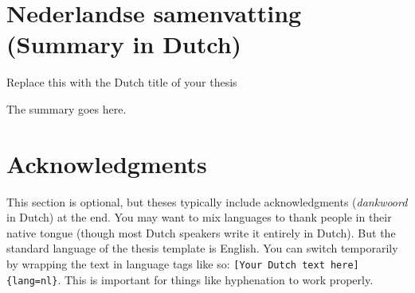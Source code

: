 \documentclass[12pt,american,a4paper,oneside,]{memoir} %
\newcommand{\textdutch}[2][]{\foreignlanguage{dutch}{#2}}
\newenvironment{dutch}[2][]{\begin{otherlanguage}{dutch}}{\end{otherlanguage}}
\begin{document}
\normalsize
\setlength{\parindent}{1.5em}

\hypertarget{nederlandse-samenvatting-summary-in-dutch}{%
\chapter*{Nederlandse samenvatting (Summary in Dutch)}\label{nederlandse-samenvatting-summary-in-dutch}}


\begin{dutch}

\emph{Replace this with the Dutch title of your thesis}

\bigskip

The summary goes here.

\end{dutch}

\hypertarget{acknowledgments}{%
\chapter*{Acknowledgments}\label{acknowledgments}}


This section is optional, but theses typically include acknowledgments (\textdutch{\emph{dankwoord}} in Dutch) at the end. You may want to mix languages to thank people in their native tongue (though most Dutch speakers write it entirely in Dutch). But the standard language of the thesis template is English. You can switch temporarily by wrapping the text in language tags like so: \texttt{{[}Your\ Dutch\ text\ here{]}\{lang=nl\}}. This is important for things like hyphenation to work properly.

\backmatter
\end{document}
